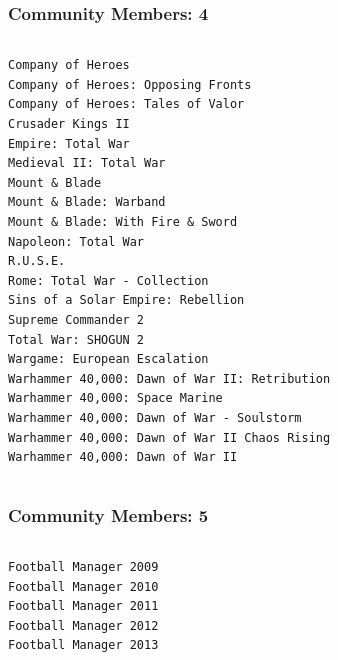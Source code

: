 \documentclass[18pt,xcolor=table]{beamer} \usefonttheme[onlymath]{serif}
\begin{document}
\begin{frame}[fragile]
  \frametitle{Community Members: 4}
  \centering
{\tiny
\begin{columns}[T]
\begin{lstlisting}
Company of Heroes
Company of Heroes: Opposing Fronts
Company of Heroes: Tales of Valor
Crusader Kings II
Empire: Total War
Medieval II: Total War
Mount & Blade
Mount & Blade: Warband
Mount & Blade: With Fire & Sword
Napoleon: Total War
R.U.S.E.
Rome: Total War - Collection
Sins of a Solar Empire: Rebellion
Supreme Commander 2
Total War: SHOGUN 2
Wargame: European Escalation
Warhammer 40,000: Dawn of War II: Retribution
Warhammer 40,000: Space Marine
Warhammer 40,000: Dawn of War - Soulstorm
Warhammer 40,000: Dawn of War II Chaos Rising
Warhammer 40,000: Dawn of War II
\end{lstlisting}
\end{columns}
} %
\end{frame}

\begin{frame}[fragile]
  \frametitle{Community Members: 5}
  \centering
{\tiny
\begin{columns}[T]
\begin{lstlisting}
Football Manager 2009
Football Manager 2010
Football Manager 2011
Football Manager 2012
Football Manager 2013
\end{lstlisting}
\end{columns}
} %
\end{frame}

\backupend
\end{document}

